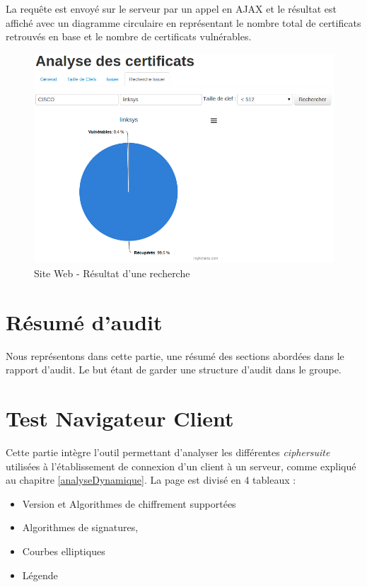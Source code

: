 La requête est envoyé sur le serveur par un appel en AJAX et le résultat est affiché avec un diagramme circulaire en représentant le nombre total de certificats retrouvés en base et le nombre de certificats vulnérables.

\begin{figure}[H]
\begin{center}
\includegraphics[scale=0.5]{images/site_web_search_result.png}
\end{center}
\caption{Site Web - Résultat d'une recherche}
\label{search_result}
\end{figure}

 
\section{Résumé d'audit}

Nous représentons dans cette partie, une résumé des sections abordées dans le rapport d'audit. Le but étant de garder une structure d'audit dans le groupe.


\section{Test Navigateur Client}

Cette partie intègre l'outil permettant d'analyser les différentes \textit{ciphersuite} utilisées à l'établissement de connexion d'un client à un serveur, comme expliqué au chapitre \ref{analyseDynamique}. La page est divisé en 4 tableaux :
\begin{itemize}
\item Version et Algorithmes de chiffrement supportées
\item Algorithmes de signatures,
\item Courbes elliptiques
\item Légende\\
\end{itemize}

